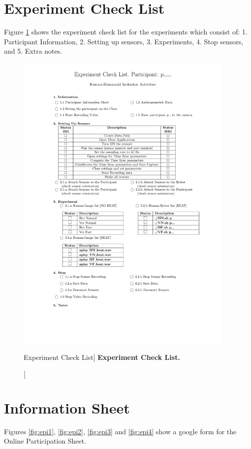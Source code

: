 \section{Experiment Check List} \label{appendix:c:ecl}
Figure \ref{fig:ecl} shows the experiment check list for the experiments 
which consist of: 1. Participant Information, 2. Setting up sensors, 
3. Experiments, 4. Stop sensors, and 5. Extra notes.
\begin{figure}
 \centering
   \includegraphics[width=0.95\textwidth]{cl}
   \caption
	[Experiment Check List]{
	{\bf Experiment Check List.}
}
   \label{fig:ecl}
\end{figure}


\section{Information Sheet} \label{appendix:d:is}
Figures \ref{fig:epi1}, \ref{fig:epi2}, \ref{fig:epi3} and \ref{fig:epi4}
show a google form for the Online Participation Sheet.

